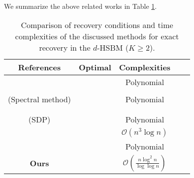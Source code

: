 \documentclass{article}
\theoremstyle{plain}
\theoremstyle{definition}
\theoremstyle{remark}
\newcommand{\OCal}{\mathcal{O}}
\begin{document}
We summarize the above related works in Table \ref{table-0}.
\vskip -0.1in
\begin{table}[!htp]
\setlength\tabcolsep{4pt}
	\caption{Comparison of recovery conditions and time complexities of the discussed methods for exact recovery in the $d$-HSBM ($K\ge 2$).}
	\label{table-0}
	\vskip 0.15in
	{\small 	\begin{center}
			\begin{tabular}{ccccc}
				\toprule
				{\bf References} & {\bf Optimal} &  {\bf Complexities} \\
				\midrule
				\citet{ghoshdastidar2015provable} & \XSolidBrush & Polynomial \\ 
				\makecell[c]{\citet{gaudio2022community}\\ (Spectral method)} & \XSolidBrush & Polynomial \\ 
				\midrule \makecell[c]{\citet{kim2018stochastic}, \\ 
					\citet{gaudio2022community} \\ (SDP)} & \XSolidBrush & Polynomial\\
				\midrule
				\citet{chien2019minimax} & \CheckmarkBold & $\OCal(n^3 \log n)$ \\
				\citet{zhang2022exact} & \CheckmarkBold & Polynomial \\
				\midrule
				\textbf{Ours} & \CheckmarkBold&  $\OCal\left(\frac{n\log^2n}{\log\log n}\right)$\\
				\bottomrule
			\end{tabular}
	\end{center} }
\end{table}
\end{document}
